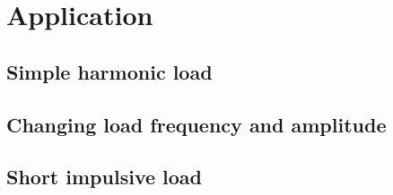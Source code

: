 \documentclass[11pt, a4paper, english]{NTNUoving}
\begin{document}
\section{Application}
\subsection{Simple harmonic load}
\subsection{Changing load frequency and amplitude}
\subsection{Short impulsive load}
\end{document}
